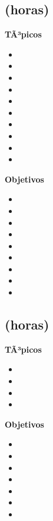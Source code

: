 \subsection{\OSTRESDef  (\OSTRESHours horas)}\label{sec:BOK-OS3}

\textbf{TÃ³picos}
\begin{itemize}
	\item \OSTRESTopicEstados
	\item \OSTRESTopicEstructuras
	\item \OSTRESTopicDespachos
	\item \OSTRESTopicEl
	\item \OSTRESTopicEjecucion
	\item \OSTRESTopicElproblema
	\item \OSTRESTopicDeadlock
	\item \OSTRESTopicModelos
	\item \OSTRESTopicProblemas
	\item \OSTRESTopicProblemasde
\end{itemize}

\textbf{Objetivos}
\begin{itemize}
	\item \OSTRESObjUNO
	\item \OSTRESObjDOS
	\item \OSTRESObjTRES
	\item \OSTRESObjCUATRO
	\item \OSTRESObjCINCO
	\item \OSTRESObjSEIS
	\item \OSTRESObjSIETE
	\item \OSTRESObjOCHO
	\item \OSTRESObjNUEVE
\end{itemize}

\subsection{\OSCUATRODef  (\OSCUATROHours horas)}\label{sec:BOK-OS4}

\textbf{TÃ³picos}
\begin{itemize}
	\item \OSCUATROTopicPlaneamiento
	\item \OSCUATROTopicPlaneamientoy
	\item \OSCUATROTopicProcesos
	\item \OSCUATROTopicDeadlines
\end{itemize}

\textbf{Objetivos}
\begin{itemize}
	\item \OSCUATROObjUNO
	\item \OSCUATROObjDOS
	\item \OSCUATROObjTRES
	\item \OSCUATROObjCUATRO
	\item \OSCUATROObjCINCO
	\item \OSCUATROObjSEIS
	\item \OSCUATROObjSIETE
\end{itemize}

